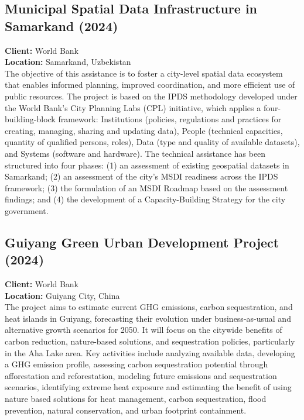 \documentclass[
	a4paper,
	12pt,
	unnumberedsections,
]{CSSullivanBusinessReport}
\begin{document}
\subsection{Municipal Spatial Data Infrastructure in Samarkand (2024)}
\textbf{Client:}  World Bank \\
\textbf{Location:}  Samarkand, Uzbekistan \\[0.5em]
 The objective of this assistance is to foster a city-level spatial data ecosystem that enables informed planning, improved coordination, and more efficient use of public resources. The project is based on the IPDS methodology developed under the World Bank’s City Planning Labs (CPL) initiative, which applies a four-building-block framework: Institutions (policies, regulations and practices for creating, managing, sharing and updating data), People (technical capacities, quantity of qualified persons, roles), Data (type and quality of available datasets), and Systems (software and hardware).  The technical assistance has been structured into four phases: (1) an assessment of existing geospatial datasets in Samarkand; (2) an assessment of the city’s MSDI readiness across the IPDS framework; (3) the formulation of an MSDI Roadmap based on the assessment findings; and (4) the development of a Capacity-Building Strategy for the city government.

\subsection{Guiyang Green Urban Development Project (2024)}
\textbf{Client:}  World Bank \\
\textbf{Location:}  Guiyang City, China \\[0.5em]
 The project aims to estimate current GHG emissions, carbon sequestration, and heat islands in Guiyang, forecasting their evolution under business-as-usual and alternative growth scenarios for 2050. It will focus on the citywide benefits of carbon reduction, nature-based solutions, and sequestration policies, particularly in the Aha Lake area. Key activities include analyzing available data, developing a GHG emission profile, assessing carbon sequestration potential through afforestation and reforestation, modeling future emissions and sequestration scenarios, identifying extreme heat exposure and estimating the benefit of using nature based solutions for heat management, carbon sequestration, flood prevention, natural conservation, and urban footprint containment.
\end{document}
